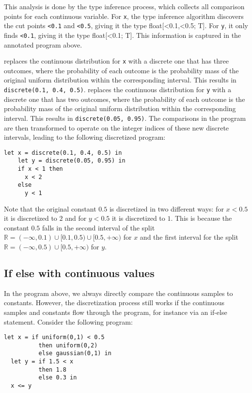 \documentclass[acmsmall,screen,dvipsnames,x11names,nonacm,anonymous,review]{acmart}
\newcommand{\codetype}[1]{\textcolor{typecolor}{\ttfamily\small#1}}
\newcommand{\Slice}{\text{\scshape Slice}\xspace}
\newcommand{\R}{\mathbb{R}}
\begin{document}
This analysis is done by the type inference process, which collects all comparison points for each continuous variable. For \texttt{x}, the type inference algorithm discovers the cut points \texttt{<0.1} and \texttt{<0.5}, giving it the type \codetype{float[<0.1,<0.5; T]}. For \texttt{y}, it only finds \texttt{<0.1}, giving it the type \codetype{float[<0.1; T]}. This information is captured in the annotated program above.

\Slice replaces the continuous distribution for \texttt{x} with a discrete one that has three outcomes, where the probability of each outcome is the probability mass of the original uniform distribution within the corresponding interval. This results in \texttt{discrete(0.1, 0.4, 0.5)}.
\Slice replaces the continuous distribution for \texttt{y} with a discrete one that has two outcomes, where the probability of each outcome is the probability mass of the original uniform distribution within the corresponding interval. This results in \texttt{discrete(0.05, 0.95)}. The comparisons in the program are then transformed to operate on the integer indices of these new discrete intervals, leading to the following discretized program:

\begin{lstlisting}[aboveskip=1em,belowskip=1em]
    let x = discrete(0.1, 0.4, 0.5) in
    let y = discrete(0.05, 0.95) in
    if x < 1 then
      x < 2
    else
      y < 1
\end{lstlisting}

Note that the original constant $0.5$ is discretized in two different ways: for $x < 0.5$ it is discretized to $2$ and for $y < 0.5$ it is discretized to $1$. This is because the constant $0.5$ falls in the second interval of the split $\R = (-\infty, 0.1) \cup [0.1, 0.5) \cup [0.5, +\infty)$ for $x$ and the first interval for the split $\R = (-\infty, 0.5) \cup [0.5, +\infty)$ for $y$.

\subsection{If else with continuous values}

In the program above, we always directly compare the continuous samples to constants.
However, the discretization process still works if the continuous samples and constants flow through the program, for instance via an if-else statement.
Consider the following program:

\begin{lstlisting}[aboveskip=1em,belowskip=1em,escapechar=!]
  let x = if uniform(0,1) < 0.5 
          then uniform(0,2) 
          else gaussian(0,1) in
  let y = if 1.5 < x
          then 1.8
          else 0.3 in
  x <= y
\end{lstlisting}
\end{document}
